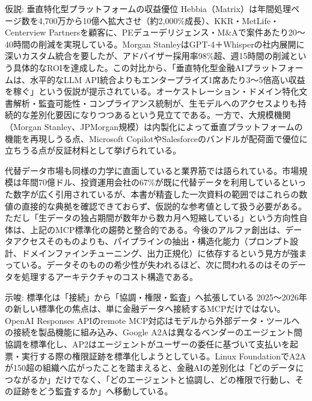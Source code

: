 \begin{insight}{仮説: 垂直特化型プラットフォームの収益優位}
Hebbia（Matrix）は年間処理ページ数を4,700万から10億へ拡大させ（約2,000\%成長）、KKR・MetLife・Centerview Partnersを顧客に、PEデューデリジェンス・M\&Aで案件あたり20〜40時間の削減を実現している。Morgan StanleyはGPT-4＋Whisperの社内展開に深いカスタム統合を要したが、アドバイザー採用率98\%超、週15時間の削減という具体的なROIを達成した。この対比から、「垂直特化型金融AIプラットフォームは、水平的なLLM API統合よりもエンタープライズ1席あたり3〜5倍高い収益を稼ぐ」という仮説が提示されている。オーケストレーション・ドメイン特化文書解析・監査可能性・コンプライアンス統制が、生モデルへのアクセスよりも持続的な差別化要因になりつつあるという見立てである。一方で、大規模機関（Morgan Stanley、JPMorgan規模）は内製化によって垂直プラットフォームの機能を再現しうる点、Microsoft CopilotやSalesforceのバンドルが配荷面で優位に立ちうる点が反証材料として挙げられている。
\end{insight}

代替データ市場も同様の力学に直面していると業界筋では語られている。市場規模は年間70億ドル、投資運用会社の67\%が既に代替データを利用しているといった数字が広く引用されているが、本書が精査した一次資料の範囲ではこれらの数値の直接的な典拠を確認できておらず、仮説的な参考値として扱う必要がある。ただし「生データの独占期間が数年から数カ月へ短縮している」という方向性自体は、上記のMCP標準化の趨勢と整合的である。今後のアルファ創出は、データアクセスそのものよりも、パイプラインの抽出・構造化能力（プロンプト設計、ドメインファインチューニング、出力正規化）に依存するという見方が強まっている。データそのものの希少性が失われるほど、次に問われるのはそのデータを処理するアーキテクチャのコスト構造である。

\begin{insight}{示唆: 標準化は「接続」から「協調・権限・監査」へ拡張している}
2025〜2026年の新しい標準化の焦点は、単に金融データへ接続するMCPだけではない。OpenAI Responses APIのremote MCP対応はモデルから外部データ・ツールへの接続を製品機能に組み込み\cite{x01openai2025responsesmcp}、Google A2Aは異なるベンダーのエージェント間協調を標準化し\cite{x01google2025a2a}、AP2はエージェントがユーザーの委任に基づいて支払いを起票・実行する際の権限証跡を標準化しようとしている\cite{x01google2025ap2}。Linux FoundationでA2Aが150超の組織へ広がったこと\cite{x01linuxfoundation2026a2a}を踏まえると、金融AIの差別化は「どのデータにつながるか」だけでなく、「どのエージェントと協調し、どの権限で行動し、その証跡をどう監査するか」へ移動している。
\end{insight}

